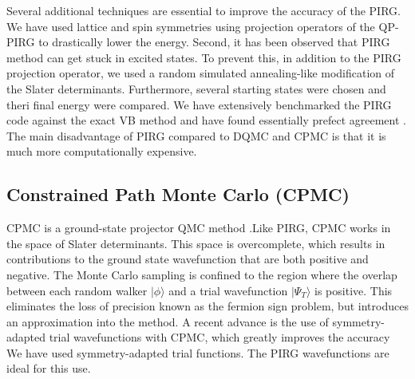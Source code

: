 \documentclass[a4paper,11pt]{article}
\begin{document}
Several additional techniques are essential to improve the accuracy of the PIRG. We have used lattice and spin symmetries using projection 
operators of the QP-PIRG to drastically lower the energy. Second, it has been observed that PIRG method can get 
stuck in excited states. To prevent this, in addition to the PIRG projection operator, we used a random simulated annealing-like modification
of the Slater determinants. Furthermore, several starting states were chosen and theri final energy were compared.
We have extensively benchmarked the PIRG code against  the exact VB method and have found essentially prefect agreement \cite{dayal11a}. 
The main disadvantage of PIRG compared to DQMC and CPMC is that it is much more computationally expensive.

\subsection{Constrained Path Monte Carlo (CPMC)}
CPMC is a ground-state projector QMC method \cite{zhang97a}.Like PIRG, CPMC works in the space of Slater determinants. This space is overcomplete, which results
in contributions to the ground state wavefunction that are both positive and negative. The Monte Carlo
sampling is confined to the region where the overlap between each random walker $|\phi\rangle$ and a trial wavefunction
$|\Psi_{T}\rangle$ is positive. This eliminates the loss of precision known as the fermion sign problem, but
introduces an approximation into the method. A recent advance is the use of symmetry-adapted trial wavefunctions
with CPMC, which greatly improves the accuracy %
We have used symmetry-adapted trial functions. 
The PIRG wavefunctions are ideal for this use.

 
\end{document}
